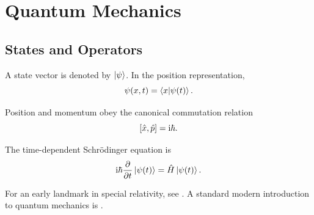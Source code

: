 \documentclass[../main.tex]{subfiles}
\begin{document}
\chapter{Quantum Mechanics}
\label{chap:quantum}

\section{States and Operators}

A state vector is denoted by $\ket{\psi}$. In the position representation,
\begin{equation}
  \psi(x,t)=\braket{x|\psi(t)}.
\end{equation}

Position and momentum obey the canonical commutation relation
\begin{equation}
  \left[\hat{x},\hat{p}\right]=\mathrm{i}\hbar.
\end{equation}

The time-dependent Schr\"odinger equation is
\begin{equation}
  \mathrm{i}\hbar\frac{\partial }{\partial t}\ket{\psi(t)}=\hat{H}\ket{\psi(t)}.
\end{equation}

For an early landmark in special relativity, see \cite{einstein1905}. A
standard modern introduction to quantum mechanics is \cite{griffiths2018}.
\end{document}
